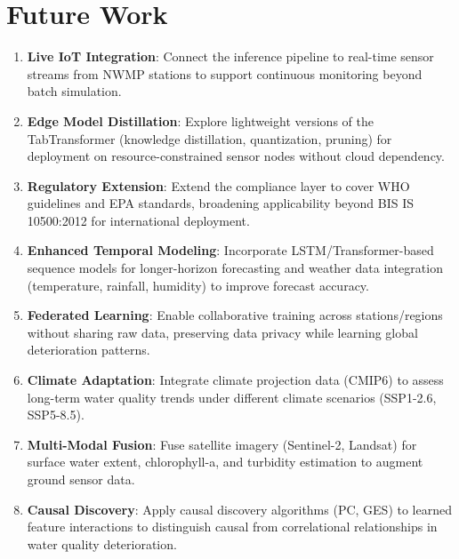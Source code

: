 \documentclass[12pt,a4paper]{report}
\numberwithin{table}{chapter}
\numberwithin{figure}{chapter}
\begin{document}
\section{Future Work}

\begin{enumerate}[leftmargin=1.5cm]
  \item \textbf{Live IoT Integration}: Connect the inference pipeline to real-time
    sensor streams from NWMP stations to support continuous monitoring beyond
    batch simulation.

  \item \textbf{Edge Model Distillation}: Explore lightweight versions of the
    TabTransformer (knowledge distillation, quantization, pruning) for deployment
    on resource-constrained sensor nodes without cloud dependency.

  \item \textbf{Regulatory Extension}: Extend the compliance layer to cover WHO
    guidelines and EPA standards, broadening applicability beyond BIS IS 10500:2012
    for international deployment.

  \item \textbf{Enhanced Temporal Modeling}: Incorporate LSTM/Transformer-based
    sequence models for longer-horizon forecasting and weather data integration
    (temperature, rainfall, humidity) to improve forecast accuracy.

  \item \textbf{Federated Learning}: Enable collaborative training across
    stations/regions without sharing raw data, preserving data privacy while
    learning global deterioration patterns.

  \item \textbf{Climate Adaptation}: Integrate climate projection data (CMIP6)
    to assess long-term water quality trends under different climate scenarios
    (SSP1-2.6, SSP5-8.5).

  \item \textbf{Multi-Modal Fusion}: Fuse satellite imagery (Sentinel-2, Landsat)
    for surface water extent, chlorophyll-a, and turbidity estimation to augment
    ground sensor data.

  \item \textbf{Causal Discovery}: Apply causal discovery algorithms (PC, GES) to
    learned feature interactions to distinguish causal from correlational
    relationships in water quality deterioration.
\end{enumerate}
\end{document}
